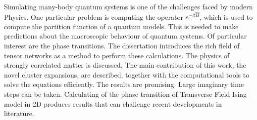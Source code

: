 Simulating many-body quantum systems is one of the challenges faced by modern Physics. One particular problem is computing the operator $e^{-\beta \hat{H}}$, which is used to compute the partition function of a quantum models.  This is needed to make predictions about the macroscopic behaviour of quantum systems. Of particular interest are the phase transitions. The dissertation introduces the rich field of tensor networks as a method to perform these calculations. The physics of strongly correlated matter is discussed. The main contribution of this work, the novel cluster expansions, are described, together with the computational tools to solve the equations efficiently. The results are promising. Large imaginary time steps can be taken. Calculating of the phase transition of Transverse Field Ising model in 2D produces results that can challenge recent developments in literature.
